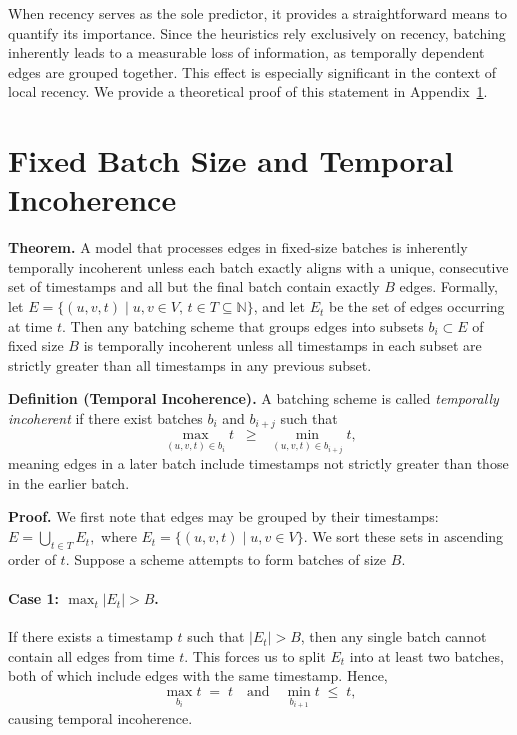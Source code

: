 When recency serves as the sole predictor, it provides a straightforward means to quantify its importance. Since the heuristics rely exclusively on recency, batching inherently leads to a measurable loss of information, as temporally dependent edges are grouped together. This effect is especially significant in the context of local recency. We provide a theoretical proof of this statement in Appendix~\ref{sec:batching_incoherency}.

\section{Fixed Batch Size and Temporal Incoherence}
\label{sec:batching_incoherency}

\noindent
\textbf{Theorem.} A model that processes edges in fixed-size batches is inherently temporally incoherent unless each batch exactly aligns with a unique, consecutive set of timestamps and all but the final batch contain exactly $B$ edges. Formally, let $E = \{(u,v,t)\mid u,v \in V,\, t\in T\subseteq \mathbb{N}\}$, and let $E_t$ be the set of edges occurring at time $t$. Then any batching scheme that groups edges into subsets $b_i \subset E$ of fixed size $B$ is temporally incoherent unless all timestamps in each subset are strictly greater than all timestamps in any previous subset.

\medskip

\noindent
\textbf{Definition (Temporal Incoherence).} A batching scheme is called \emph{temporally incoherent} if there exist batches $b_i$ and $b_{i+j}$ such that
$$
\max_{(u,v,t)\in b_i} t \;\;\ge\;\; \min_{(u,v,t)\in b_{i+j}} t,
$$
meaning edges in a later batch include timestamps not strictly greater than those in the earlier batch.

\medskip

\noindent
\textbf{Proof.}
We first note that edges may be grouped by their timestamps: $E = \bigcup_{t \in T} E_t,$ where $E_t = \{(u,v,t) \mid u,v \in V\}$. We sort these sets in ascending order of $t$. Suppose a scheme attempts to form batches of size $B$.

\paragraph{Case 1: $\max_t |E_t| > B$.}
If there exists a timestamp $t$ such that $|E_t|>B$, then any single batch cannot contain all edges from time $t$. This forces us to split $E_t$ into at least two batches, both of which include edges with the same timestamp. Hence,
$$
\max_{b_i} t \;=\; t \quad\text{and}\quad \min_{b_{i+1}} t \;\le\; t,
$$
causing temporal incoherence.

